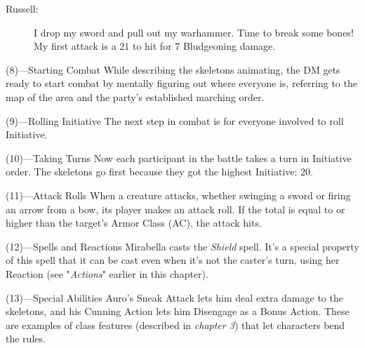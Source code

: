 \documentclass[10pt,a4paper,twoside,bg=print,twocolumn,openany,nodeprecatedcode]{dndbook}
\begin{document}
\begin{description}
\item[Russell:]
I drop my sword and pull out my warhammer. Time to break some bones! My first attack is a 21 to hit for 7 Bludgeoning damage.
\end{description}

\begin{DndSidebar}[float=!b]{(8)—Starting Combat}
While describing the skeletons animating, the DM gets ready to start combat by mentally figuring out where everyone is, referring to the map of the area and the party's established marching order.



\end{DndSidebar}

\begin{DndSidebar}[float=!b]{(9)—Rolling Initiative}
The next step in combat is for everyone involved to roll Initiative.



\end{DndSidebar}

\begin{DndSidebar}[float=!b]{(10)—Taking Turns}
Now each participant in the battle takes a turn in Initiative order. The skeletons go first because they got the highest Initiative: 20.



\end{DndSidebar}

\begin{DndSidebar}[float=!b]{(11)—Attack Rolls}
When a creature attacks, whether swinging a sword or firing an arrow from a bow, its player makes an attack roll. If the total is equal to or higher than the target's Armor Class (AC), the attack hits.



\end{DndSidebar}

\begin{DndSidebar}[float=!b]{(12)—Spells and Reactions}
Mirabella casts the \textit{Shield} spell. It's a special property of this spell that it can be cast even when it's not the caster's turn, using her Reaction (see "\textit{Actions}" earlier in this chapter).



\end{DndSidebar}

\begin{DndSidebar}[float=!b]{(13)—Special Abilities}
Auro's Sneak Attack lets him deal extra damage to the skeletons, and his Cunning Action lets him Disengage as a Bonus Action. These are examples of class features (described in \textit{chapter 3}) that let characters bend the rules.



\end{DndSidebar}
\end{document}
